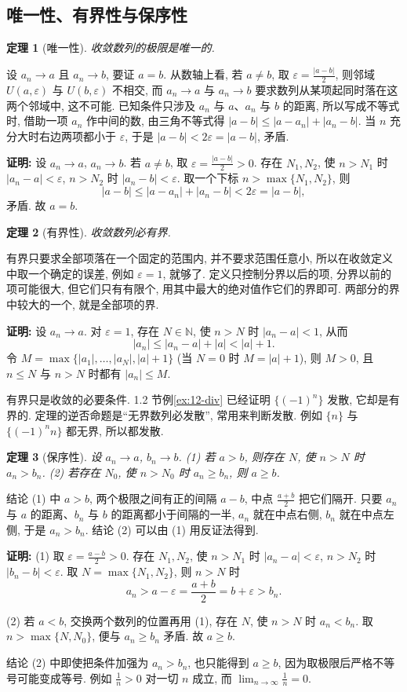 \documentclass[UTF8,openany]{ctexbook}
\theoremstyle{chinesetextbook}
\newtheorem{theorem}{定理}[section]
\newenvironment{cnproof}{\par\indent\textbf{证明:} \ignorespaces}{\par}
\begin{document}
\subsection{唯一性、有界性与保序性}
\begin{theorem}[唯一性]
收敛数列的极限是唯一的.
\end{theorem}
设 $a_n\to a$ 且 $a_n\to b$, 要证 $a=b$. 从数轴上看, 若 $a\ne b$, 取 $\displaystyle\varepsilon=\frac{|a-b|}2$, 则邻域 $U(a,\varepsilon)$ 与 $U(b,\varepsilon)$ 不相交, 而 $a_n\to a$ 与 $a_n\to b$ 要求数列从某项起同时落在这两个邻域中, 这不可能. 已知条件只涉及 $a_n$ 与 $a$、$a_n$ 与 $b$ 的距离, 所以写成不等式时, 借助一项 $a_n$ 作中间的数, 由三角不等式得 $|a-b|\le|a-a_n|+|a_n-b|$. 当 $n$ 充分大时右边两项都小于 $\varepsilon$, 于是 $|a-b|<2\varepsilon=|a-b|$, 矛盾.
\begin{cnproof}
设 $a_n\to a$, $a_n\to b$. 若 $a\ne b$, 取 $\displaystyle\varepsilon=\frac{|a-b|}2>0$. 存在 $N_1,N_2$, 使 $n>N_1$ 时 $|a_n-a|<\varepsilon$, $n>N_2$ 时 $|a_n-b|<\varepsilon$. 取一个下标 $n>\max\{N_1,N_2\}$, 则
\[
|a-b|\le|a-a_n|+|a_n-b|<2\varepsilon=|a-b|,
\]
矛盾. 故 $a=b$.
\end{cnproof}
\begin{theorem}[有界性]
收敛数列必有界.
\end{theorem}
有界只要求全部项落在一个固定的范围内, 并不要求范围任意小, 所以在收敛定义中取一个确定的误差, 例如 $\varepsilon=1$, 就够了. 定义只控制分界以后的项, 分界以前的项可能很大, 但它们只有有限个, 用其中最大的绝对值作它们的界即可. 两部分的界中较大的一个, 就是全部项的界.
\begin{cnproof}
设 $a_n\to a$. 对 $\varepsilon=1$, 存在 $N\in\mathbb N$, 使 $n>N$ 时 $|a_n-a|<1$, 从而
\[
|a_n|\le|a_n-a|+|a|<|a|+1.
\]
令 $M=\max\{|a_1|,\ldots,|a_N|,|a|+1\}$ (当 $N=0$ 时 $M=|a|+1$), 则 $M>0$, 且 $n\le N$ 与 $n>N$ 时都有 $|a_n|\le M$.
\end{cnproof}
有界只是收敛的必要条件. 1.2 节例\ref{ex:12-div} 已经证明 $\{(-1)^n\}$ 发散, 它却是有界的. 定理的逆否命题是“无界数列必发散”, 常用来判断发散. 例如 $\{n\}$ 与 $\{(-1)^nn\}$ 都无界, 所以都发散.
\begin{theorem}[保序性]
设 $a_n\to a$, $b_n\to b$. \textup{(1)} 若 $a>b$, 则存在 $N$, 使 $n>N$ 时 $a_n>b_n$. \textup{(2)} 若存在 $N_0$, 使 $n>N_0$ 时 $a_n\ge b_n$, 则 $a\ge b$.
\end{theorem}
结论 (1) 中 $a>b$, 两个极限之间有正的间隔 $a-b$, 中点 $\displaystyle\frac{a+b}2$ 把它们隔开. 只要 $a_n$ 与 $a$ 的距离、$b_n$ 与 $b$ 的距离都小于间隔的一半, $a_n$ 就在中点右侧, $b_n$ 就在中点左侧, 于是 $a_n>b_n$. 结论 (2) 可以由 (1) 用反证法得到.
\begin{cnproof}
(1) 取 $\displaystyle\varepsilon=\frac{a-b}2>0$. 存在 $N_1,N_2$, 使 $n>N_1$ 时 $|a_n-a|<\varepsilon$, $n>N_2$ 时 $|b_n-b|<\varepsilon$. 取 $N=\max\{N_1,N_2\}$, 则 $n>N$ 时
\[
a_n>a-\varepsilon=\frac{a+b}2=b+\varepsilon>b_n.
\]

(2) 若 $a<b$, 交换两个数列的位置再用 (1), 存在 $N$, 使 $n>N$ 时 $a_n<b_n$. 取 $n>\max\{N,N_0\}$, 便与 $a_n\ge b_n$ 矛盾. 故 $a\ge b$.
\end{cnproof}
结论 (2) 中即使把条件加强为 $a_n>b_n$, 也只能得到 $a\ge b$, 因为取极限后严格不等号可能变成等号. 例如 $\displaystyle\frac1n>0$ 对一切 $n$ 成立, 而 $\displaystyle\lim_{n\to\infty}\frac1n=0$.
\end{document}
